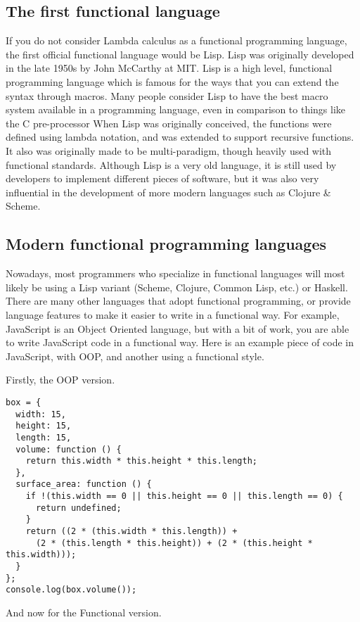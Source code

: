 \documentclass{report}
\begin{document}
\subsection{The first functional language}
If you do not consider Lambda calculus as a functional programming language, the first official functional language would be Lisp. Lisp was originally developed in the late 1950s by John McCarthy at MIT. Lisp is a high level, functional programming language which is famous for the ways that you can extend the syntax through macros. Many people consider Lisp to have the best macro system available in a programming language, even in comparison to things like the C pre-processor 
When Lisp was originally conceived, the functions were defined using lambda notation, and was extended to support recursive functions. It also was originally made to be multi-paradigm, though heavily used with functional standards. Although Lisp is a very old language, it is still used by developers to implement different pieces of software, but it was also very influential in the development of more modern languages such as Clojure \& Scheme.
\subsection{Modern functional programming languages}
Nowadays, most programmers who specialize in functional languages will most likely be using a Lisp variant (Scheme, Clojure, Common Lisp, etc.) or Haskell. There are many other languages that adopt functional programming, or provide language features to make it easier to write in a functional way. For example, JavaScript is an Object Oriented language, but with a bit of work, you are able to write JavaScript code in a functional way. Here is an example piece of code in JavaScript, with OOP, and another using a functional style.

Firstly, the OOP version.

\begin{lstlisting}
box = {
  width: 15,
  height: 15,
  length: 15,
  volume: function () {
    return this.width * this.height * this.length;
  },
  surface_area: function () {
    if !(this.width == 0 || this.height == 0 || this.length == 0) {
      return undefined;
    }
    return ((2 * (this.width * this.length)) + 
      (2 * (this.length * this.height)) + (2 * (this.height * this.width)));
  }
};
console.log(box.volume());
\end{lstlisting}

And now for the Functional version.
\end{document}
